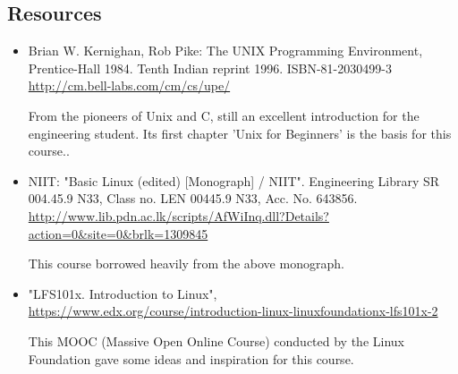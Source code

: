 \documentclass[11pt,a4paper,twoside]{article}
\begin{document}
\subsection*{Resources}
\begin{itemize}
\item Brian W. Kernighan, Rob Pike: The UNIX Programming Environment, 
Prentice-Hall 1984. Tenth Indian reprint 1996. ISBN-81-2030499-3 \\
\url{http://cm.bell-labs.com/cm/cs/upe/}

From the pioneers of Unix and C, still an excellent introduction for the
engineering student. Its first chapter 'Unix for Beginners' is the basis
for this course..

\item NIIT: "Basic Linux (edited) [Monograph] / NIIT". Engineering Library 
SR 004.45.9 N33, Class no. LEN 00445.9 N33, Acc. No. 643856. \\
\url{http://www.lib.pdn.ac.lk/scripts/AfWiInq.dll?Details?action=0&site=0&brlk=1309845}

This course borrowed heavily from the above monograph.

\item "LFS101x. Introduction to Linux", \\
\url{https://www.edx.org/course/introduction-linux-linuxfoundationx-lfs101x-2}

This MOOC (Massive Open Online Course) conducted by the Linux Foundation gave some
ideas and inspiration for this course.

\end{itemize}
\end{document}
